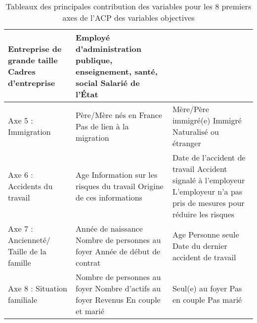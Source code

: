 \documentclass[11pt,fleqn,a4paper,openany,frenchb]{book} %
\begin{document}
\begin{table}[!h]
\begin{tabular}{|p{4cm}|p{5cm}|p{5cm}|}
    \newline Entreprise de grande taille
    \newline Cadres d'entreprise
    & Employé d'administration publique, enseignement, santé, social
    \newline Salarié de l'\'Etat \\
    \hline
    Axe 5 : Immigration
    & Père/Mère nés en France
    \newline Pas de lien à la migration 
    & Mère/Père immigré(e)
    \newline Immigré
    \newline Naturalisé ou étranger\\
    \hline  
    Axe 6 : Accidents du travail
    & Age
    \newline Information sur les risques du travail
    \newline Origine de ces informations
    & Date de l'accident de travail
    \newline Accident signalé à l'employeur
    \newline L'employeur n'a pas pris de mesures pour réduire les risques \\
    \hline
    Axe 7 : Ancienneté/ Taille de la famille %
    & Année de naissance
    \newline Nombre de personnes au foyer
    \newline Année de début de contrat
    & Age 
    \newline Personne seule
    \newline Date du dernier accident de travail \\
    \hline
    Axe 8 : Situation familiale
    & Nombre de personnes au foyer
    \newline Nombre d'actifs au foyer 
    \newline Revenus
    \newline En couple et marié
    & Seul(e) au foyer
    \newline Pas en couple
    \newline Pas marié \\
    \hline

\end{tabular}%
\caption{Tableaux des principales contribution des variables pour les 8 premiers axes de l’ACP des variables objectives}
\label{tab:ACPobj}
\end{table}
\newpage
\end{document}
